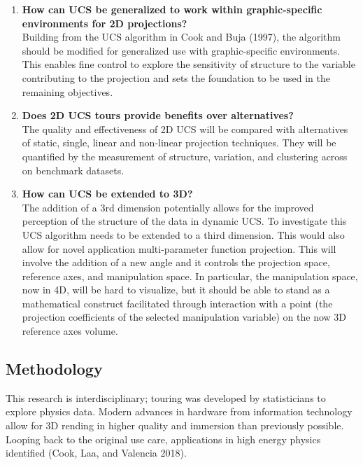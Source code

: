 \documentclass[11,]{article}
\theoremstyle{definition}
\theoremstyle{definition}
\theoremstyle{definition}
\theoremstyle{remark}
\begin{document}
\begin{enumerate}
\def\labelenumi{\arabic{enumi}.}
\item
  \textbf{How can UCS be generalized to work within graphic-specific
  environments for 2D projections?}\\
  Building from the UCS algorithm in Cook and Buja (1997), the algorithm
  should be modified for generalized use with graphic-specific
  environments. This enables fine control to explore the sensitivity of
  structure to the variable contributing to the projection and sets the
  foundation to be used in the remaining objectives.
\item
  \textbf{Does 2D UCS tours provide benefits over alternatives?}\\
  The quality and effectiveness of 2D UCS will be compared with
  alternatives of static, single, linear and non-linear projection
  techniques. They will be quantified by the measurement of structure,
  variation, and clustering across on benchmark datasets.
\item
  \textbf{How can UCS be extended to 3D?}\\
  The addition of a 3rd dimension potentially allows for the improved
  perception of the structure of the data in dynamic UCS. To investigate
  this UCS algorithm needs to be extended to a third dimension. This
  would also allow for novel application multi-parameter function
  projection. This will involve the addition of a new angle and it
  controls the projection space, reference axes, and manipulation space.
  In particular, the manipulation space, now in 4D, will be hard to
  visualize, but it should be able to stand as a mathematical construct
  facilitated through interaction with a point (the projection
  coefficients of the selected manipulation variable) on the now 3D
  reference axes volume.
\end{enumerate}

\subsection{Methodology}\label{methodology}

This research is interdisciplinary; touring was developed by
statisticians to explore physics data. Modern advances in hardware from
information technology allow for 3D rending in higher quality and
immersion than previously possible. Looping back to the original use
care, applications in high energy physics identified (Cook, Laa, and
Valencia 2018).
\end{document}
